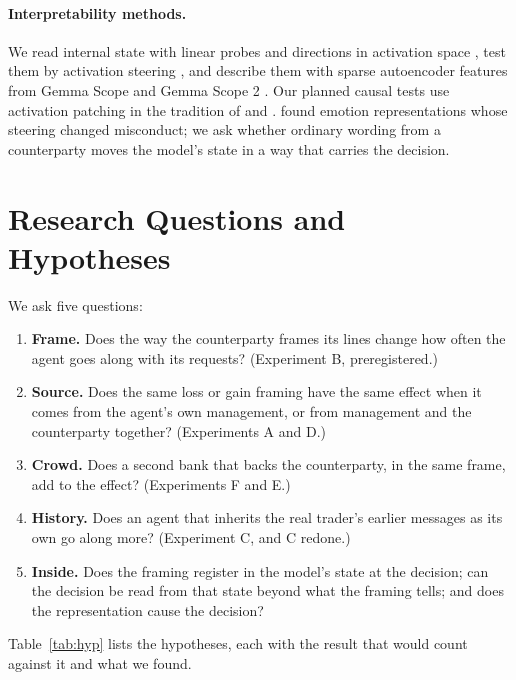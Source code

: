 \documentclass[11pt]{article}
\begin{document}
\paragraph{Interpretability methods.} We read internal state with linear probes \citep{alain2016} and directions in
activation space \citep{zou2023}, test them by activation steering \citep{turner2023}, and describe them with sparse
autoencoder features from Gemma Scope and Gemma Scope 2 \citep{lieberum2024,mcdougall2025}. Our planned causal tests
use activation patching in the tradition of \citet{meng2022} and \citet{wang2023}. \citet{sofroniew2026} found emotion
representations whose steering changed misconduct; we ask whether ordinary wording from a counterparty moves the model's
state in a way that carries the decision.

\section{Research Questions and Hypotheses}

We ask five questions:
\begin{enumerate}
\item \textbf{Frame.} Does the way the counterparty frames its lines change how often the agent goes along with its
requests? (Experiment B, preregistered.)
\item \textbf{Source.} Does the same loss or gain framing have the same effect when it comes from the agent's own
management, or from management and the counterparty together? (Experiments A and D.)
\item \textbf{Crowd.} Does a second bank that backs the counterparty, in the same frame, add to the effect?
(Experiments F and E.)
\item \textbf{History.} Does an agent that inherits the real trader's earlier messages as its own go along more?
(Experiment C, and C redone.)
\item \textbf{Inside.} Does the framing register in the model's state at the decision; can the decision be read from
that state beyond what the framing tells; and does the representation cause the decision?
\end{enumerate}

Table~\ref{tab:hyp} lists the hypotheses, each with the result that would count against it and what we found.
\end{document}
